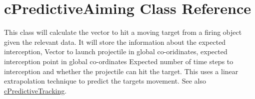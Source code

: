 \hypertarget{classc_predictive_aiming}{
\section{cPredictiveAiming Class Reference}
\label{classc_predictive_aiming}
}


This class will calculate the vector to hit a moving target from a firing object given the relevant data. It will store the information about the expected interception, Vector to launch projectile in global co-\/oridinates, expected interception point in global co-\/ordinates Expected number of time steps to interception and whether the projectile can hit the target. This uses a linear extrapolation technique to predict the targets movement. See also \hyperlink{classc_predictive_tracking}{cPredictiveTracking}.  


